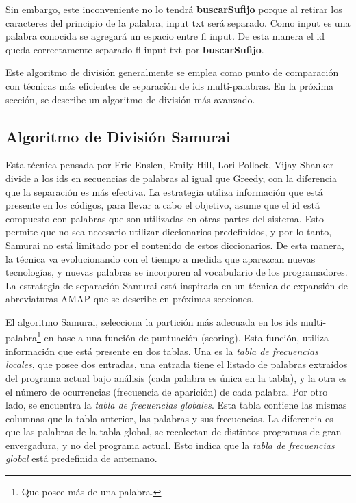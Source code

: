 Sin embargo, este inconveniente no lo tendrá \textbf{buscarSufijo} porque al retirar los caracteres del principio de la palabra, \textsf{input txt} será separado. Como \textsf{input} es una palabra conocida se agregará un espacio entre \textsf{fl input}. De esta manera el id queda correctamente separado \textsf{fl input txt} por \textbf{buscarSufijo}.

Este algoritmo de división generalmente se emplea como punto de comparación con técnicas más eficientes de separación de ids multi-palabras. En la próxima sección, se describe un algoritmo de división más avanzado.


\subsection{Algoritmo de División Samurai}
\label{sec:algSamu}

Esta técnica pensada por Eric Enslen, Emily Hill, Lori Pollock, Vijay-Shanker \cite{EHPV09} divide a los ids en secuencias de palabras al igual que Greedy, con la diferencia que la separación es más efectiva. La estrategia utiliza información que está presente en los códigos, para llevar a cabo el objetivo, asume que el id está compuesto con palabras que son utilizadas en otras partes del sistema. Esto permite que no sea necesario utilizar diccionarios predefinidos, y por lo tanto, Samurai no está limitado por el contenido de estos diccionarios. De esta manera, la técnica va evolucionando con el tiempo a medida que aparezcan nuevas tecnologías, y nuevas palabras se incorporen al vocabulario de los programadores.
La estrategia de separación Samurai está inspirada en un técnica de expansión de abreviaturas AMAP \cite{EZH08} que se describe en próximas secciones.

El algoritmo Samurai, selecciona la partición más adecuada en los ids multi-palabra\footnote[1]{Que posee más de una palabra.} en base a una función de puntuación (scoring). Esta función, utiliza información que está presente en dos tablas.
Una es la \textit{tabla de frecuencias locales}, que posee dos entradas, una entrada tiene el listado de palabras extraídos del programa actual bajo análisis (cada palabra es única en la tabla), y la otra es el número de ocurrencias (frecuencia de aparición) de cada palabra.
Por otro lado, se encuentra la \textit{tabla de frecuencias globales}. Esta tabla contiene las mismas columnas que la tabla anterior, las palabras y sus frecuencias. La diferencia es que las palabras de la tabla global, se recolectan de distintos programas de gran envergadura, y no del programa actual. Esto indica que la \textit{tabla de frecuencias global} está predefinida de antemano.

